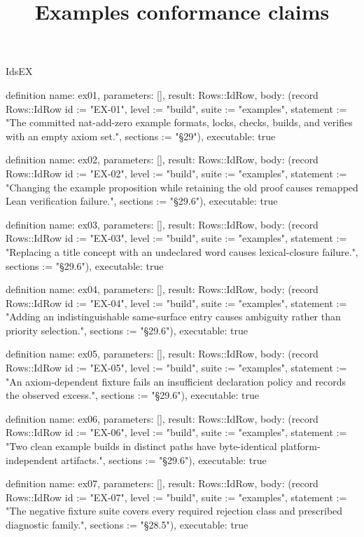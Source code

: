 \begin{lexlean}{IdsEX}
\title{Examples conformance claims}
\begin{semanticmodule}
definition{
  name: ex01,
  parameters: [],
  result: Rows::IdRow,
  body: (record Rows::IdRow {id := "EX-01", level := "build", suite := "examples", statement := "The committed nat-add-zero example formats, locks, checks, builds, and verifies with an empty axiom set.", sections := "§29"}),
  executable: true
}

definition{
  name: ex02,
  parameters: [],
  result: Rows::IdRow,
  body: (record Rows::IdRow {id := "EX-02", level := "build", suite := "examples", statement := "Changing the example proposition while retaining the old proof causes remapped Lean verification failure.", sections := "§29.6"}),
  executable: true
}

definition{
  name: ex03,
  parameters: [],
  result: Rows::IdRow,
  body: (record Rows::IdRow {id := "EX-03", level := "build", suite := "examples", statement := "Replacing a title concept with an undeclared word causes lexical-closure failure.", sections := "§29.6"}),
  executable: true
}

definition{
  name: ex04,
  parameters: [],
  result: Rows::IdRow,
  body: (record Rows::IdRow {id := "EX-04", level := "build", suite := "examples", statement := "Adding an indistinguishable same-surface entry causes ambiguity rather than priority selection.", sections := "§29.6"}),
  executable: true
}

definition{
  name: ex05,
  parameters: [],
  result: Rows::IdRow,
  body: (record Rows::IdRow {id := "EX-05", level := "build", suite := "examples", statement := "An axiom-dependent fixture fails an insufficient declaration policy and records the observed excess.", sections := "§29.6"}),
  executable: true
}

definition{
  name: ex06,
  parameters: [],
  result: Rows::IdRow,
  body: (record Rows::IdRow {id := "EX-06", level := "build", suite := "examples", statement := "Two clean example builds in distinct paths have byte-identical platform-independent artifacts.", sections := "§29.6"}),
  executable: true
}

definition{
  name: ex07,
  parameters: [],
  result: Rows::IdRow,
  body: (record Rows::IdRow {id := "EX-07", level := "build", suite := "examples", statement := "The negative fixture suite covers every required rejection class and prescribed diagnostic family.", sections := "§28.5"}),
  executable: true
}


\end{semanticmodule}
\end{lexlean}
